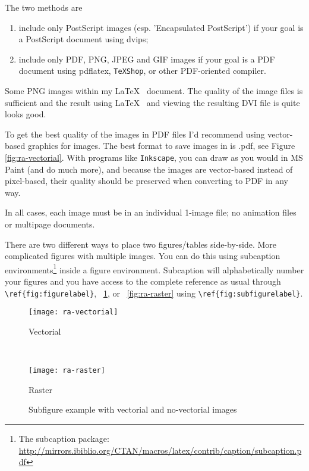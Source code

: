 The two methods are

\begin{enumerate}
\item  include only PostScript images (esp. 'Encapsulated PostScript') if your goal is a PostScript document using dvips;
\item include only PDF, PNG, JPEG and GIF images if your goal is a PDF document using pdflatex, \texttt{TeXShop}, or other PDF-oriented compiler. 
\end{enumerate}

Some PNG images within my \LaTeX~ document. The quality of the image files is sufficient and the result using \LaTeX~ and viewing the resulting DVI file is quite looks good.

To get the best quality of the images in  PDF files I'd recommend using vector-based graphics for images. The best format to save images in is .pdf, see Figure \ref{fig:ra-vectorial}. With programs like \texttt{Inkscape}, you can draw as you would in MS Paint (and do much more), and because the images are vector-based instead of pixel-based, their quality should be preserved when converting to PDF in any way.    

In all cases, each image must be in an individual 1-image file; no animation files or multipage documents. 

There are two different ways to place two figures/tables side-by-side.  More complicated figures with multiple images. You can do this using subcaption environments\footnote{The subcaption package: \url{http://mirrors.ibiblio.org/CTAN/macros/latex/contrib/caption/subcaption.pdf}} inside a figure environment. Subcaption will alphabetically number your figures and you have access to the complete reference as usual through \verb|\ref{fig:figurelabel}|, \figurename~\ref{fig:figura-completa}, or \figurename~\ref{fig:ra-raster} using \verb|\ref{fig:subfigurelabel}|.

\begin{figure}[t!]
	\centering
    \begin{subcaptionblock}{.4\textwidth}
       \centering
       \texttt{[image: ra-vectorial]}
       \caption{Vectorial}\label{fig:ra-vectorial}
     \end{subcaptionblock}%
     ~
     \begin{subcaptionblock}{.4\textwidth}
       \centering
       \texttt{[image: ra-raster]}
       \caption{Raster}\label{fig:ra-raster}
     \end{subcaptionblock}%
  \caption{Subfigure example with vectorial and no-vectorial images}
  \label{fig:figura-completa}
\end{figure}

